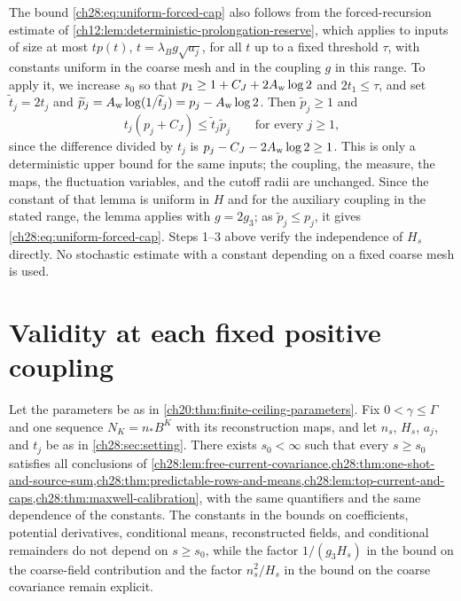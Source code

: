 \begin{remark}\label{ch28:rem:forced-cap-alternative}
The bound \eqref{ch28:eq:uniform-forced-cap} also follows from the forced-recursion estimate of \cref{ch12:lem:deterministic-prolongation-reserve}, which applies to inputs of size at most $tp(t)$, $t=\lambda_Bg\sqrt{a_j}$, for all $t$ up to a fixed threshold $\tau$, with constants uniform in the coarse mesh and in the coupling $g$ in this range. To apply it, we increase $s_0$ so that $p_1\ge1+C_J+2A_{\rm w}\log2$ and $2t_1\le\tau$, and set $\widetilde t_j=2t_j$ and $\widetilde p_j=A_{\rm w}\log(1/\widetilde t_j)=p_j-A_{\rm w}\log2$. Then $\widetilde p_j\ge1$ and
\begin{equation}\label{ch28:eq:cap-input-enclosure}
 t_j(p_j+C_J)\le\widetilde t_j\widetilde p_j\qquad\text{for every }j\ge1,
\end{equation}
since the difference divided by $t_j$ is $p_j-C_J-2A_{\rm w}\log2\ge1$. This is only a deterministic upper bound for the same inputs; the coupling, the measure, the maps, the fluctuation variables, and the cutoff radii are unchanged. Since the constant of that lemma is uniform in $H$ and for the auxiliary coupling in the stated range, the lemma applies with $g=2g_3$; as $\widetilde p_j\le p_j$, it gives \eqref{ch28:eq:uniform-forced-cap}. Steps 1--3 above verify the independence of $H_s$ directly. No stochastic estimate with a constant depending on a fixed coarse mesh is used.
\end{remark}

\section{Validity at each fixed positive coupling}\label{ch28:sec:fixed-coupling}

\begin{lemma}\label{ch28:lem:finite-ceiling-current-suppliers}
Let the parameters be as in \cref{ch20:thm:finite-ceiling-parameters}. Fix $0<\gamma\le\Gamma$ and one sequence $N_K=n_*B^K$ with its reconstruction maps, and let $n_s$, $H_s$, $a_j$, and $t_j$ be as in \cref{ch28:sec:setting}. There exists $s_0<\infty$ such that every $s\ge s_0$ satisfies all conclusions of \cref{ch28:lem:free-current-covariance,ch28:thm:one-shot-and-source-sum,ch28:thm:predictable-rows-and-means,ch28:lem:top-current-and-caps,ch28:thm:maxwell-calibration}, with the same quantifiers and the same dependence of the constants. The constants in the bounds on coefficients, potential derivatives, conditional means, reconstructed fields, and conditional remainders do not depend on $s\ge s_0$, while the factor $1/(g_3H_s)$ in the bound on the coarse-field contribution and the factor $n_s^2/H_s$ in the bound on the coarse covariance remain explicit.
\end{lemma}

